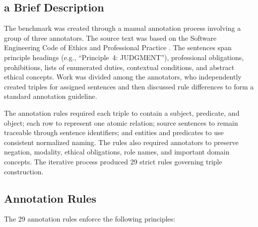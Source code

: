 \documentclass[conference]{IEEEtran}
\begin{document}
\subsection{a Brief Description}
The benchmark was created through a manual annotation process involving a group of three annotators. The source text was based on the Software Engineering Code of Ethics and Professional Practice \cite{acm1999code}. The sentences span principle headings (e.g., ``Principle~4: JUDGMENT''), professional obligations, prohibitions, lists of enumerated duties, contextual conditions, and abstract ethical concepts. Work was divided among the annotators, who independently created triples for assigned sentences and then discussed rule differences to form a standard annotation guideline.

The annotation rules required each triple to contain a subject, predicate, and object; each row to represent one atomic relation; source sentences to remain traceable through sentence identifiers; and entities and predicates to use consistent normalized naming. The rules also required annotators to preserve negation, modality, ethical obligations, role names, and important domain concepts. The iterative process produced 29 strict rules governing triple construction.

\subsection{Annotation Rules}
The 29 annotation rules enforce the following principles:
\end{document}
